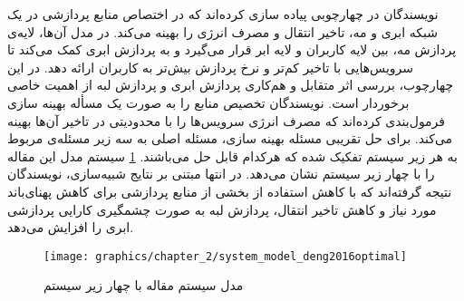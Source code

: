 %

    نویسندگان در \cite{deng2016optimal} چهارچوبی پیاده سازی کرده‌اند که در اختصاص منابع پردازشی در یک شبکه ابری و مه، تاخیر انتقال و مصرف انرژی را بهینه می‌کند.
    در مدل آن‌ها، لایه‌ی پردازش مه، بین لایه کاربران و لایه‌ ابر قرار می‌گیرد و به پردازش ابری کمک می‌کند تا سرویس‌هایی با تاخیر کم‌تر و نرخ پردازش بیش‌تر به کاربران ارائه دهد.
    در این چهارچوب، بررسی اثر متقابل و هم‌کاری پردازش ابری و پردازش لبه از اهمیت خاصی برخوردار است.
    نویسندگان تخصیص منابع را به صورت یک مسأله بهینه سازی فرمول‌بندی کرده‌اند که مصرف انرژی سرویس‌ها را با محدودیتی در تاخیر آن‌ها بهینه می‌کند.
    برای حل تقریبی مسئله بهینه سازی، مسئله اصلی به سه زیر مسئله‌ی مربوط به هر زیر سیستم تفکیک شده که هرکدام قابل حل می‌باشند.
    \cref{fig:chapter_2:system_model_deng2016optimal} سیستم مدل این مقاله را با چهار زیر سیستم نشان می‌دهد.
    در انتها مبتنی بر نتایج شبیه‌سازی، نویسندگان نتیجه گرفته‌اند که با کاهش استفاده از بخشی از منابع پردازشی برای کاهش پهنای‌باند مورد نیاز و کاهش تاخیر انتقال، پردازش لبه به صورت چشمگیری کارایی پردازشی ابری را افزایش می‌دهد.

    \begin{figure}[h]
      \centerline{\texttt{[image: graphics/chapter\_2/system\_model\_deng2016optimal]}}
      \caption{مدل سیستم مقاله \cite{deng2016optimal} با چهار زیر سیستم}
      \label{fig:chapter_2:system_model_deng2016optimal}
    \end{figure}

